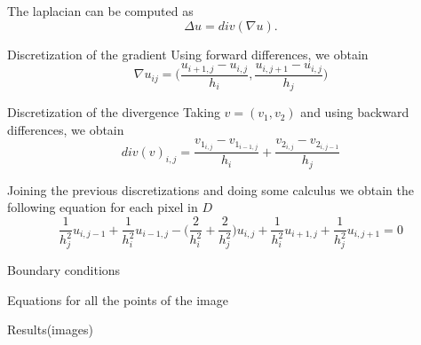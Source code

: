 \documentclass[11pt]{beamer}
\begin{document}
\begin{frame}
The laplacian can be computed as
$$\Delta u = div(\nabla u).$$

\begin{block}{Discretization of the gradient}
Using forward differences, we obtain
$$\nabla u_{ij} = \bigg(\frac{u_{i+1,j} - u_{i,j}}{h_i}, \frac{u_{i,j+1} - u_{i,j}}{h_j}\bigg)$$
\end{block}
\begin{block}{Discretization of the divergence}
Taking $v = (v_1, v_2)$ and using backward differences, we obtain
$$div(v)_{i,j} = \frac{v_{1_{i,j}} - v_{1_{i-1,j}}}{h_i} + \frac{v_{2_{i,j}} - v_{2_{i,j-1}}}{h_j}$$
\end{block}
\end{frame}

\begin{frame}
Joining the previous discretizations and doing some calculus we obtain the following equation for each pixel in $D$
$$\frac{1}{h_j^2}u_{i,j-1} + \frac{1}{h_i^2}u_{i-1, j} - \bigg(\frac{2}{h_i^2}+\frac{2}{h_j^2}\bigg)u_{i,j} + \frac{1}{h_i^2}u_{i+1,j} + \frac{1}{h_j^2}u_{i, j+1} = 0$$


\end{frame}

\begin{frame}
Boundary conditions
\end{frame}

\begin{frame}
Equations for all the points of the image
\end{frame}

\begin{frame}
Results(images)
\end{frame}
\end{document}
